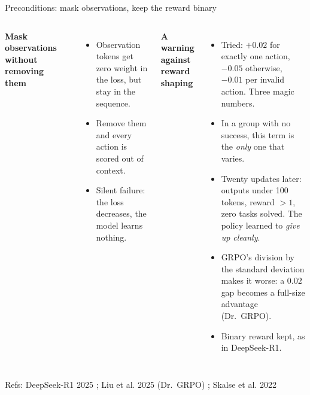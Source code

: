 \documentclass[aspectratio=169,10pt]{beamer}
\newcommand{\refs}[1]{\vfill{\tiny\textcolor{crMid}{Refs: #1}}}
\begin{document}
\begin{frame}{Preconditions: mask observations, keep the reward binary}
\begin{columns}[T]
\textbf{Mask observations without removing them}
\begin{center}
\end{center}
\footnotesize
\begin{itemize}
  \item Observation tokens get zero weight in the loss, but stay in the sequence.
  \item Remove them and every action is scored out of context.
  \item Silent failure: the loss decreases, the model learns nothing.
\end{itemize}
\textbf{A warning against reward shaping}
\footnotesize
\begin{itemize}
  \item Tried: $+0.02$ for exactly one action, $-0.05$ otherwise, $-0.01$ per invalid action. Three magic numbers.
  \item In a group with no success, this term is the \emph{only} one that varies.
  \item Twenty updates later: outputs under 100 tokens, reward $>1$, zero tasks solved. The policy learned to \emph{give up cleanly}.
  \item GRPO's division by the standard deviation makes it worse: a $0.02$ gap becomes a full-size advantage (Dr.~GRPO).
  \item Binary reward kept, as in DeepSeek-R1.
\end{itemize}
\end{columns}
\refs{DeepSeek-R1 2025 ; Liu et al. 2025 (Dr.~GRPO) ; Skalse et al. 2022}
\end{frame}
\end{document}
